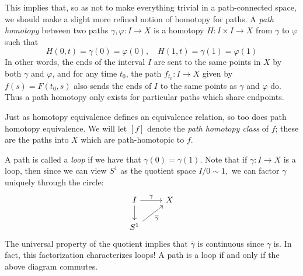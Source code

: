 \documentclass[10pt]{amsart}
\theoremstyle{definition}
\newcommand{\cdef}[1]{\textcolor{Bittersweet}{#1}}
\begin{document}
This implies that, so as not to make everything trivial in a path-connected space, we should make a slight more refined notion of homotopy for paths.
A \cdef{\emph{path homotopy}} between two paths $\gamma, \varphi:I \to X$ is a homotopy $H: I \times I \to X$ from $\gamma$ to $\varphi$ such that 
\[
H(0, t) = \gamma(0) = \varphi(0), \quad H(1, t) = \gamma(1) = \varphi(1)
\]
In other words, the ends of the interval $I$ are sent to the same points in $X$ by both $\gamma$ and $\varphi$, and for any time $t_0$, the path $f_{t_0}:I \to X$ given by $f(s) = F(t_0, s)$ also sends the ends of $I$ to the same points as $\gamma$ and $\varphi$ do. Thus a path homotopy only exists for particular paths which share endpoints. 

Just as homotopy equivalence defines an equivalence relation, so too does path homotopy equivalence. We will let $[f]$ denote the \cdef{\emph{path homotopy class}} of $f$; these are the paths into $X$ which are path-homotopic to $f$.

A path is called a \cdef{\emph{loop}} if we have that $\gamma(0) = \gamma(1)$. Note that if $\gamma:I \to X$ is a loop, then since we can view $S^1$ as the quotient space $I/0 \sim 1,$ we can factor $\gamma$ uniquely through the circle:
\[
\begin{tikzcd}
	I & X \\
	{S^1}
	\arrow["\gamma", from=1-1, to=1-2]
	\arrow[from=1-1, to=2-1]
	\arrow["{\overline{\gamma}}"', from=2-1, to=1-2]
\end{tikzcd}
\]
The universal property of the quotient implies that $\overline{\gamma}$ is continuous since $\gamma$ is. In fact, this factorization characterizes loops! A path is a loop if and only if the above diagram commutes.
\end{document}
